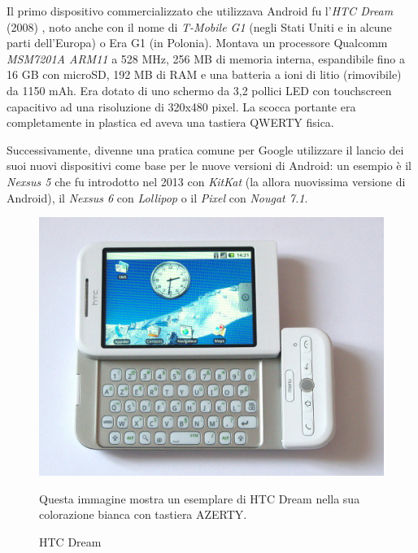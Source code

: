 Il primo dispositivo commercializzato che utilizzava Android fu l'\textit{HTC Dream} (2008) \cite{androidwikipedia}, noto anche con il nome di \textit{T-Mobile G1} (negli Stati Uniti e in alcune parti dell'Europa) o Era G1 (in Polonia). Montava un processore Qualcomm \textit{MSM7201A ARM11} a 528 MHz, 256 MB di memoria interna, espandibile fino a 16 GB con microSD, 192 MB di RAM e una batteria a ioni di litio (rimovibile) da 1150 mAh. Era dotato di uno schermo da 3,2 pollici LED con touchscreen capacitivo ad una risoluzione di 320x480 pixel. La scocca portante era completamente in plastica ed aveva una tastiera QWERTY fisica.

Successivamente, divenne una pratica comune per Google utilizzare il lancio dei suoi nuovi dispositivi come base per le nuove versioni di Android: un esempio è il \textit{Nexsus 5} che fu introdotto nel 2013 \cite{androidwikipedia} con \textit{KitKat} (la allora nuovissima versione di Android), il \textit{Nexsus 6} con \textit{Lollipop} o il \textit{Pixel} con \textit{Nougat 7.1}.

\begin{figure}[H]
  \includegraphics[scale=0.27]{android/imgs/htc_dream.jpeg}
  \caption{HTC Dream}
  Questa immagine \cite{androidwikipedia} mostra un esemplare di HTC Dream nella sua colorazione bianca con tastiera AZERTY.
\end{figure}